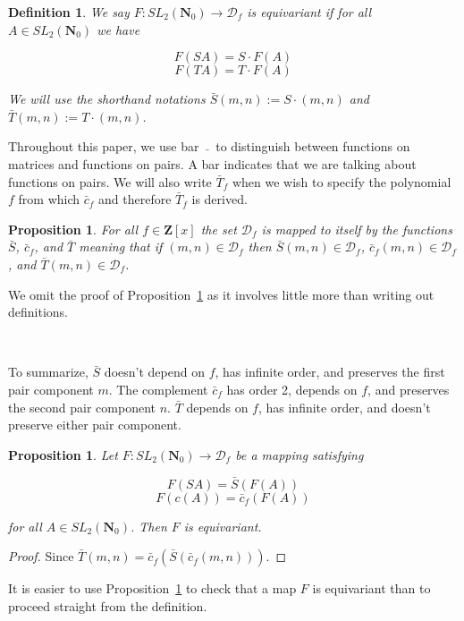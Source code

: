 \documentclass{article}
\newtheorem{definition}[theorem]{Definition}  %
\newtheorem{proposition}[theorem]{Proposition}  %
\begin{document}
\begin{definition}
We say $F: SL_2(\mathbf{N}_0) \rightarrow \mathcal{D}_f$ is equivariant if for all $A \in SL_2(\mathbf{N}_0)$ we have

$$F(SA) = S \cdot F(A)$$
$$F(TA) = T \cdot F(A)$$

We will use the shorthand notations $\bar{S}(m, n) := S \cdot (m, n)$ and $\bar{T}(m, n) := T \cdot (m, n)$.
\end{definition}

Throughout this paper, we use bar $ \ \bar{} \ $ to distinguish between functions on matrices and functions on pairs. A bar indicates that we are talking about functions on pairs. We will also write $\bar{T}_f$ when we wish to specify the polynomial $f$ from which $\bar{c}_f$ and therefore $\bar{T}_f$ is derived.  

\begin{proposition}\label{invariance}
For all $f \in \mathbf{Z}[x]$ the set $\mathcal{D}_f$ is mapped to itself by the functions $\bar{S}$, $\bar{c}_f$, and $\bar{T}$ meaning that if $(m, n) \in \mathcal{D}_f$ then $\bar{S}(m, n) \in \mathcal{D}_f$, $\bar{c}_f(m, n) \in \mathcal{D}_f$, and $\bar{T}(m, n) \in \mathcal{D}_f$.
\end{proposition}

We omit the proof of Proposition~\ref{invariance} as it involves little more than writing out definitions.

\

To summarize, $\bar{S}$ doesn't depend on $f$, has infinite order, and preserves the first pair component $m$. The complement $\bar{c}_f$ has order 2, depends on $f$, and preserves the second pair component $n$. $\bar{T}$ depends on $f$, has infinite order, and doesn't preserve either pair component.

\begin{proposition}\label{prop_equivariant}
Let $F: SL_2(\mathbf{N}_0) \rightarrow \mathcal{D}_f$ be a mapping satisfying

$$F(SA) = \bar{S}\left(F(A)\right)$$
$$F\left(c(A)\right) = \bar{c}_f\left(F(A)\right)$$

for all $A \in SL_2(\mathbf{N}_0)$. Then $F$ is equivariant.
\end{proposition}

\begin{proof}
Since $\bar{T}(m, n) = \bar{c}_f\left(\bar{S}\left(\bar{c}_f(m, n)\right)\right)$.
\end{proof}

It is easier to use Proposition~\ref{prop_equivariant} to check that a map $F$ is equivariant than to proceed straight from the definition.
\end{document}
